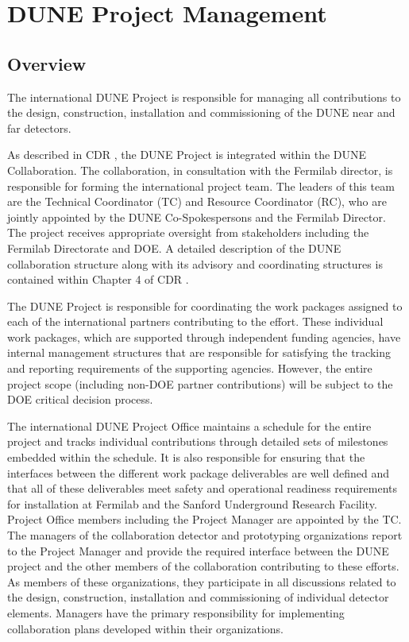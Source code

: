 \chapter{DUNE Project Management}
\label{ch:detectors-pm}

\section{Overview}


The international DUNE Project is responsible for managing all
contributions to the design, construction, installation and
commissioning of the DUNE near and far detectors.

As described in CDR \volintro, the DUNE Project is integrated within the
DUNE Collaboration.  The collaboration, in consultation with the
Fermilab director, is responsible for forming the international
project team.  The leaders of this team are the Technical Coordinator
(TC) and Resource Coordinator (RC), who are jointly appointed by the
DUNE Co-Spokespersons and the Fermilab Director.  The project receives
appropriate oversight from stakeholders including the Fermilab
Directorate and DOE.  A detailed description of the DUNE collaboration
structure along with its advisory and coordinating structures is
contained within Chapter 4  of CDR \volintro.

The DUNE Project is responsible for coordinating the work
packages assigned to each of the international partners contributing
to the effort.  These individual work packages, which are supported
through independent funding agencies, have internal management
structures that are responsible for satisfying the tracking and
reporting requirements of the supporting agencies.  However, the
entire project scope (including non-DOE partner contributions) will be
subject to the DOE critical decision process.

The international DUNE Project Office maintains a schedule for the
entire project and tracks individual contributions through detailed
sets of milestones embedded within the schedule.  It is also responsible
for ensuring that the interfaces between the different work package
deliverables are well defined and that all of these deliverables meet
safety and operational readiness requirements for installation at
Fermilab and the Sanford Underground Research Facility.  Project
Office members including the Project Manager are appointed by the TC.
The managers of the collaboration detector and prototyping
organizations report to the Project Manager and provide the required
interface between the DUNE project and the other members of the
collaboration contributing to these efforts.  As members of these
organizations, they participate in all discussions related to the
design, construction, installation and commissioning of individual
detector elements.  Managers have the primary responsibility for
implementing collaboration plans developed within their organizations.
 
